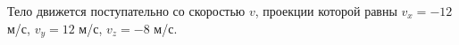Тело движется поступательно со скоростью $v$, проекции
которой равны $v_{x}=-12$ м/с, $v_{y}=12$ м/с, $v_{z}=-8$ м/с.
